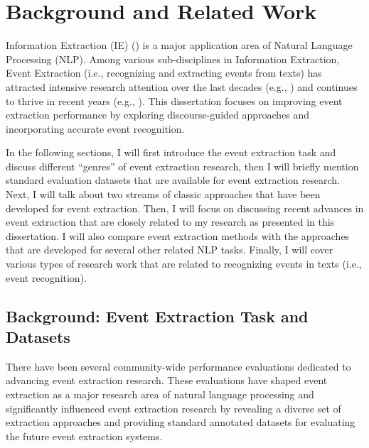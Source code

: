 \chapter{Background and Related Work}
\label{Chapter:Background}

Information Extraction (IE) 
(\cite{Hobbs10}) 
is a major application area of 
Natural Language Processing (NLP). 
Among various sub-disciplines in Information Extraction, 
Event Extraction (i.e., recognizing and extracting events from texts) 
has attracted intensive research attention 
over the last decades (e.g., \cite{hobbs93,autoslog-aaai93,riloff-aaai96,huffman96,yangarber00,freitag-acl98})
and continues to thrive 
in recent years (e.g., \cite{chieu02,califf03,finn04,shinyama06,maslennikov07,patwardhan-emnlp09,Ritter12}). 
This dissertation focuses on improving event extraction performance 
by exploring discourse-guided approaches and incorporating 
accurate event recognition. 

In the following sections, I will first introduce 
the event extraction task and discuss different ``genres'' 
of event extraction research, then I will 
briefly mention standard evaluation datasets 
that are available for event extraction research. 
Next, I will talk about two streams of classic approaches 
that have been developed for event extraction. 
Then, I will focus on discussing recent advances in event extraction 
that are closely related to my research as presented in this dissertation. 
I will also compare event extraction methods with the approaches
that are developed for 
several other related NLP tasks. 
Finally, I will cover various types of research work that are related to 
recognizing events in texts (i.e., event recognition). 

\section{Background: Event Extraction Task and Datasets}

There have been several community-wide performance evaluations dedicated 
to advancing event extraction research. These evaluations 
have shaped event extraction as a major research area of natural 
language processing and significantly influenced 
event extraction research by 
revealing
a diverse set of extraction approaches and 
providing standard annotated datasets for evaluating the future 
event extraction systems. 

